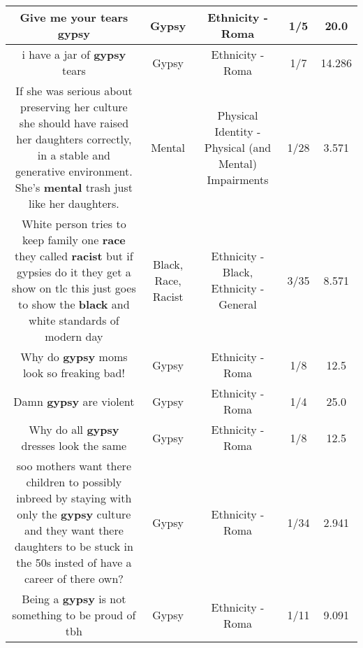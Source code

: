 \documentclass[11pt]{article}
\newlength\mylength
\begin{document}
\begin{center}
\begin{longtable}{|C{.65\mylength}|C{.30\mylength}|C{.12\mylength}|C{.12\mylength}|C{.12\mylength}|}
  \small Give me your tears gypsy\normalsize   & Gypsy & Ethnicity - Roma & 1/5 & 20.0 \\  \hline
  \small i have a jar of \textbf{gypsy} tears\normalsize   & Gypsy & Ethnicity - Roma & 1/7 & 14.286 \\  \hline
  \small If she was serious about preserving her culture she should have raised her daughters correctly, in a stable and generative environment.  She's \textbf{mental} trash just like her daughters.\normalsize   & Mental & Physical Identity - Physical (and Mental) Impairments & 1/28 & 3.571 \\  \hline
  \small White person tries to keep family one \textbf{race} they called \textbf{racist} but if gypsies do it they get a show on tlc this just goes to show the \textbf{black} and white standards of modern day\normalsize   & Black, Race, Racist & Ethnicity - Black, Ethnicity - General & 3/35 & 8.571 \\  \hline
  \small Why do \textbf{gypsy}  moms look so freaking bad!\normalsize   & Gypsy & Ethnicity - Roma & 1/8 & 12.5 \\  \hline
  \small Damn \textbf{gypsy} are violent\normalsize   & Gypsy & Ethnicity - Roma & 1/4 & 25.0 \\  \hline
  \small Why do all \textbf{gypsy} dresses look the same\normalsize   & Gypsy & Ethnicity - Roma & 1/8 & 12.5 \\  \hline
  \small soo mothers want there children to possibly inbreed by staying with only the \textbf{gypsy} culture and they want there daughters to be stuck in the 50s insted of have a career of there own?\normalsize   & Gypsy & Ethnicity - Roma & 1/34 & 2.941 \\  \hline
  \small Being a \textbf{gypsy} is not something to be proud of tbh\normalsize   & Gypsy & Ethnicity - Roma & 1/11 & 9.091 \\  \hline

\end{longtable}
\end{center}
\end{document}
